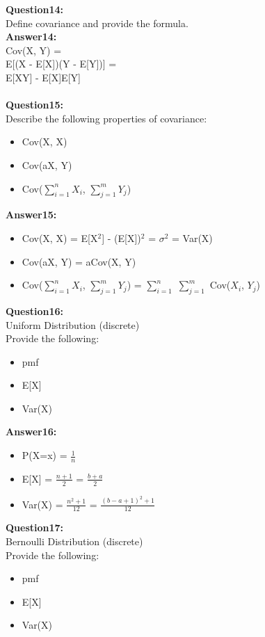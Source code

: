 \documentclass{article}
\begin{document}
\textbf{Question14:} \\
Define covariance and provide the formula.
\\
\textbf{Answer14:} \\
Cov(X, Y) = \\
E[(X - E[X])(Y - E[Y])] = \\
E[XY] - E[X]E[Y]
\\\\


\textbf{Question15:} \\
Describe the following properties of covariance:\\
\begin{itemize}
	\item Cov(X, X)
	\item Cov(aX, Y)
	\item Cov($\sum_{i=1}^n X_i$, $\sum_{j=1}^m Y_j$)
\end{itemize}

\textbf{Answer15:} \\
\begin{itemize}
	\item Cov(X, X) = E[X$^2$] - (E[X])$^2$ = $\sigma^2$ = Var(X)
	\item Cov(aX, Y) = aCov(X, Y)
	\item Cov($\sum_{i=1}^n X_i$, $\sum_{j=1}^m Y_j$) = $\sum_{i=1}^n$ $\sum_{j=1}^m$ Cov($X_i$, $Y_j$)
\end{itemize}


\textbf{Question16:} \\
Uniform Distribution (discrete)\\
Provide the following:
\begin{itemize}
	\item pmf
	\item E[X]
	\item Var(X)
\end{itemize}

\textbf{Answer16:} \\
\begin{itemize}
	\item P(X=x) = $\frac{1}{n}$
	\item E[X] = $\frac{n + 1}{2}$ = $\frac{b + a}{2}$
	\item Var(X) = $\frac{n^2 + 1}{12}$ = $\frac{(b - a + 1)^2 + 1}{12}$
\end{itemize}


\textbf{Question17:} \\
Bernoulli Distribution (discrete)\\
Provide the following:
\begin{itemize}
	\item pmf
	\item E[X]
	\item Var(X)
\end{itemize}
\end{document}
